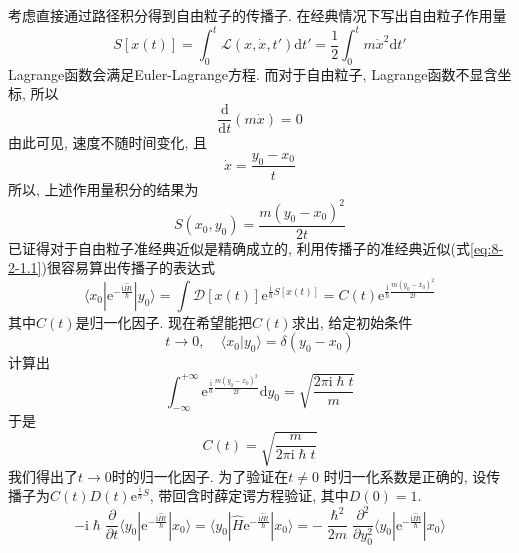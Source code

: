         考虑直接通过路径积分得到自由粒子的传播子. 在经典情况下写出自由粒子作用量
        \begin{equation}
            S[x(t)] = \int_0^t \mathcal{L}(x,\dot{x},t') \mathrm{d}t' = \frac 12 \int_0^t m\dot{x}^2 \mathrm{d}t'
        \end{equation}
        Lagrange函数会满足Euler-Lagrange方程. 而对于自由粒子, Lagrange函数不显含坐标, 所以
        \begin{equation}
            \frac {\mathrm{d}}{\mathrm{d}t} (m \dot x) = 0
        \end{equation}
        由此可见, 速度不随时间变化, 且
        \begin{equation}
            \dot{x} = \frac{y_0 - x_0}t
        \end{equation}
        所以, 上述作用量积分的结果为
        \begin{equation}
            S(x_0, y_0) = \frac{m(y_0 - x_0)^2}{2t}
        \end{equation}
        已证得对于自由粒子准经典近似是精确成立的, 利用传播子的准经典近似(式\ref{eq:8-2-1.1})很容易算出传播子的表达式
        \begin{equation}
            \langle x_0 | \mathrm{e}^{-\frac {\mathrm{i}\hat{H}t}{\hslash}} | y_0 \rangle = \int \mathcal{D}[x(t)] \mathrm{e}^{ \frac{\mathrm{i}}{\hslash} S[x(t)] } = C(t) \mathrm{e}^{\frac {\mathrm{i}}{\hslash} \frac{m(y_0 - x_0)^2}{2t}}
        \end{equation}
        其中$C(t)$是归一化因子. 现在希望能把$C(t)$求出, 给定初始条件
        \begin{equation}
            t \to 0,~~~~~\langle x_0|y_0\rangle = \delta(y_0-x_0)
        \end{equation}
        计算出
        \begin{equation}
            \int_{-\infty}^{+\infty} \mathrm{e}^{\frac {\mathrm{i}}{\hslash} \frac {m(y_0 - x_0)^2}{2t}}\mathrm{d}y_0 = \sqrt{\frac {2\pi\mathrm{i}\hslash t}m}
        \end{equation}
        于是
        \begin{equation}\label{eq:8-2-3}
            C(t) = \sqrt{\frac m{2\pi\mathrm{i}\hslash t}}
        \end{equation}
        我们得出了$t \to 0$时的归一化因子. 为了验证在$t \neq 0$ 时归一化系数是正确的, 设传播子为$C(t) D(t) \mathrm{e}^{\frac{\mathrm{i}}{\hslash}S}$, 带回含时薛定谔方程验证, 其中$D(0) = 1$.
        \begin{equation}
            -\mathrm{i}\hslash \frac {\partial}{\partial t} \langle y_0 | \mathrm{e}^{-\frac {\mathrm{i}\hat{H}t}{\hslash}} |x_0 \rangle =  \langle y_0 | \hat{H} \mathrm{e}^{-\frac {\mathrm{i}\hat{H}t}{\hslash}} |x_0 \rangle = -\frac {\hslash^2}{2m} \frac {\partial^2}{\partial y_0^2} \langle y_0 | \mathrm{e}^{-\frac {\mathrm{i}\hat{H}t}{\hslash}} |x_0 \rangle
        \end{equation}
